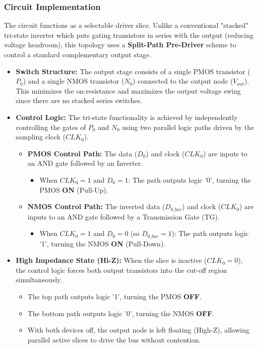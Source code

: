 \subsubsection*{Circuit Implementation}
The circuit functions as a selectable driver slice. Unlike a conventional "stacked" tri-state inverter which puts gating transistors in series with the output (reducing voltage headroom), this topology uses a \textbf{Split-Path Pre-Driver} scheme to control a standard complementary output stage.

\begin{itemize}
    \item \textbf{Switch Structure:} The output stage consists of a single PMOS transistor ($P_0$) and a single NMOS transistor ($N_0$) connected to the output node ($V_{out}$). This minimizes the on-resistance and maximizes the output voltage swing since there are no stacked series switches.
    
    \item \textbf{Control Logic:} The tri-state functionality is achieved by independently controlling the gates of $P_0$ and $N_0$ using two parallel logic paths driven by the sampling clock ($CLK_0$).
    \begin{itemize}
        \item \textbf{PMOS Control Path:} The data ($D_0$) and clock ($CLK_0$) are inputs to an AND gate followed by an Inverter.
        \begin{itemize}
            \item When $CLK_0 = 1$ and $D_0 = 1$: The path outputs logic '0', turning the PMOS \textbf{ON} (Pull-Up).
        \end{itemize}
        \item \textbf{NMOS Control Path:} The inverted data ($D_{0\_bar}$) and clock ($CLK_0$) are inputs to an AND gate followed by a Transmission Gate (TG).
        \begin{itemize}
             \item When $CLK_0 = 1$ and $D_0 = 0$ (so $D_{0\_bar} = 1$): The path outputs logic '1', turning the NMOS \textbf{ON} (Pull-Down).
        \end{itemize}
    \end{itemize}

    \item \textbf{High Impedance State (Hi-Z):} When the slice is inactive ($CLK_0 = 0$), the control logic forces both output transistors into the cut-off region simultaneously.
    \begin{itemize}
        \item The top path outputs logic '1', turning the PMOS \textbf{OFF}.
        \item The bottom path outputs logic '0', turning the NMOS \textbf{OFF}.
        \item With both devices off, the output node is left floating (High-Z), allowing parallel active slices to drive the bus without contention.
    \end{itemize}

\end{itemize}
